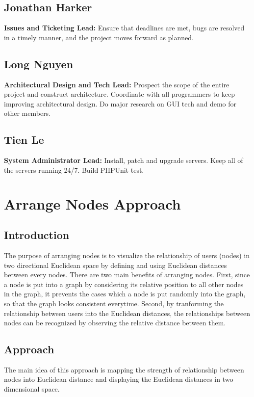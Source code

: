 \documentclass[12pt, letterpaper]{article}
\begin{document}
  \subsection{Jonathan Harker}
  {\bf Issues and Ticketing Lead:} Ensure that deadlines are met, bugs are resolved in a timely manner, and the project moves forward as planned.
  \subsection{Long Nguyen}
  {\bf Architectural Design and Tech Lead:} Prospect the scope of the entire project and construct architecture. Coordinate with all programmers to keep improving architectural design. Do major research on GUI tech and demo for other members.
  \subsection{Tien Le}
  {\bf System Administrator Lead:} Install, patch and upgrade servers. Keep all of the servers running 24/7. Build PHPUnit test.

\section{Arrange Nodes Approach}
 \subsection{Introduction}
  The purpose of arranging nodes is to visualize the relationship of
  users (nodes) in two directional Euclidean space by defining and using Euclidean distances between
  every nodes. There are two main benefits of arranging nodes. First,
  since a node is put into a graph by considering its relative
  position to all other nodes in the graph, it prevents the cases
  which a node is put randomly into the graph, so that the graph looks
  consistent everytime. Second, by tranforming the relationship between
  users into the Euclidean distances, the relationships between nodes
  can be recognized by observing the relative distance between them. 
 \subsection{Approach}
 The main idea of this approach is mapping the strength of
 relationship between nodes into Euclidean distance and displaying the
 Euclidean distances in two dimensional space. 
\end{document}
